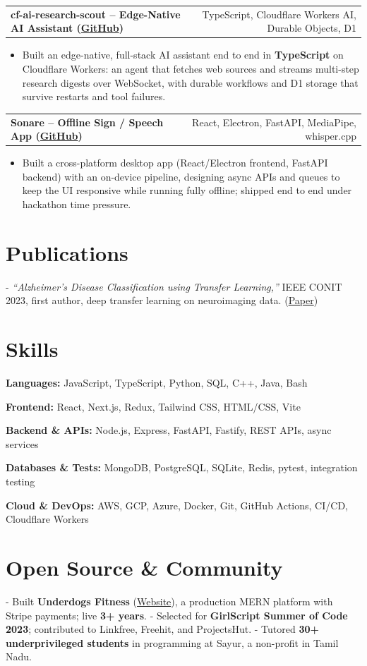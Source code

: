 \documentclass[letterpaper,11pt]{article}
\makeatletter
\newcommand{\projItem}[2]{%
  \vspace{2pt}
  \begin{tabular*}{\textwidth}{@{}l@{\extracolsep{\fill}}r@{}}
    \textbf{#1} & #2 \\
  \end{tabular*}\par\vspace{-3pt}
}
\newcommand{\skillLine}[2]{\textbf{#1:} #2\par\vspace{1.5pt}}
\newcommand{\inlineBlock}[1]{{\setlength{\leftskip}{0.18in}\small #1\par}}
\makeatother
\begin{document}
\projItem{cf-ai-research-scout -- Edge-Native AI Assistant {\normalfont\small(\href{https://github.com/Deva-1903/cf_ai_research_scout}{GitHub})}}{TypeScript, Cloudflare Workers AI, Durable Objects, D1}
\begin{itemize}
  \item Built an edge-native, full-stack AI assistant end to end in \textbf{TypeScript} on Cloudflare Workers: an agent that fetches web sources and streams multi-step research digests over WebSocket, with durable workflows and D1 storage that survive restarts and tool failures.
\end{itemize}

\projItem{Sonare -- Offline Sign / Speech App {\normalfont\small(\href{https://github.com/Deva-1903/Qualcomm-Sep25-Team-Sonare}{GitHub})}}{React, Electron, FastAPI, MediaPipe, whisper.cpp}
\begin{itemize}
  \item Built a cross-platform desktop app (React/Electron frontend, FastAPI backend) with an on-device pipeline, designing async APIs and queues to keep the UI responsive while running fully offline; shipped end to end under hackathon time pressure.
\end{itemize}

\section{Publications}
\vspace{2pt}
\inlineBlock{- \textit{``Alzheimer's Disease Classification using Transfer Learning,''} IEEE CONIT 2023, first author, deep transfer learning on neuroimaging data. {\normalfont\small(\href{https://ieeexplore.ieee.org/document/10205760}{Paper})}}

\section{Skills}
\skillLine{Languages}{JavaScript, TypeScript, Python, SQL, C++, Java, Bash}
\skillLine{Frontend}{React, Next.js, Redux, Tailwind CSS, HTML/CSS, Vite}
\skillLine{Backend \& APIs}{Node.js, Express, FastAPI, Fastify, REST APIs, async services}
\skillLine{Databases \& Tests}{MongoDB, PostgreSQL, SQLite, Redis, pytest, integration testing}
\skillLine{Cloud \& DevOps}{AWS, GCP, Azure, Docker, Git, GitHub Actions, CI/CD, Cloudflare Workers}

\section{Open Source \& Community}
\inlineBlock{- Built \textbf{Underdogs Fitness} (\href{https://www.underdogsfitness.in/}{Website}), a production MERN platform with Stripe payments; live \textbf{3+ years}. - Selected for \textbf{GirlScript Summer of Code 2023}; contributed to Linkfree, Freehit, and ProjectsHut. - Tutored \textbf{30+ underprivileged students} in programming at Sayur, a non-profit in Tamil Nadu.}
\end{document}
